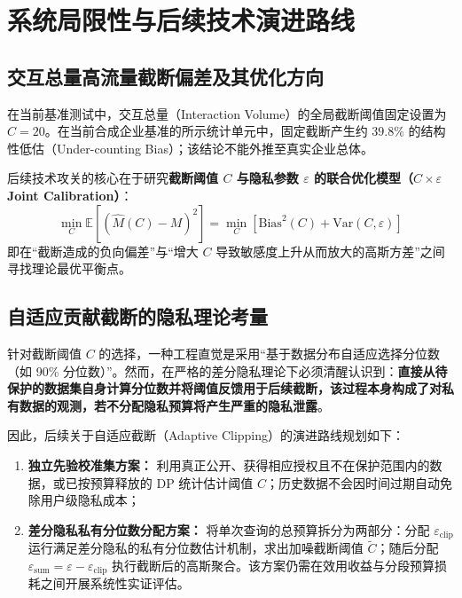 \section{系统局限性与后续技术演进路线}
\label{sec:limitations}

\subsection{交互总量高流量截断偏差及其优化方向}
在当前基准测试中，交互总量（Interaction Volume）的全局截断阈值固定设置为 $C=20$。在当前合成企业基准的所示统计单元中，固定截断产生约 $39.8\%$ 的结构性低估（Under-counting Bias）；该结论不能外推至真实企业总体。

后续技术攻关的核心在于研究\textbf{截断阈值 $C$ 与隐私参数 $\varepsilon$ 的联合优化模型（$C \times \varepsilon$ Joint Calibration）}：
\begin{equation}
  \min_{C} \mathbb{E}\left[ \left( \hat{M}(C) - M \right)^2 \right] = \min_{C} \left[ \text{Bias}^2(C) + \text{Var}(C, \varepsilon) \right]
\end{equation}
即在“截断造成的负向偏差”与“增大 $C$ 导致敏感度上升从而放大的高斯方差”之间寻找理论最优平衡点。

\subsection{自适应贡献截断的隐私理论考量}
针对截断阈值 $C$ 的选择，一种工程直觉是采用“基于数据分布自适应选择分位数（如 90\% 分位数）”。然而，在严格的差分隐私理论下必须清醒认识到：\textbf{直接从待保护的数据集自身计算分位数并将阈值反馈用于后续截断，该过程本身构成了对私有数据的观测，若不分配隐私预算将产生严重的隐私泄露}。

因此，后续关于自适应截断（Adaptive Clipping）的演进路线规划如下：
\begin{enumerate}[label=(\alph*), leftmargin=2.5em]
  \item \textbf{独立先验校准集方案：} 利用真正公开、获得相应授权且不在保护范围内的数据，或已按预算释放的 DP 统计估计阈值 $C$；历史数据不会因时间过期自动免除用户级隐私成本；
  \item \textbf{差分隐私私有分位数分配方案：} 将单次查询的总预算拆分为两部分：分配 $\varepsilon_{\text{clip}}$ 运行满足差分隐私的私有分位数估计机制，求出加噪截断阈值 $\tilde{C}$；随后分配 $\varepsilon_{\text{sum}} = \varepsilon - \varepsilon_{\text{clip}}$ 执行截断后的高斯聚合。该方案仍需在效用收益与分段预算损耗之间开展系统性实证评估。
\end{enumerate}

